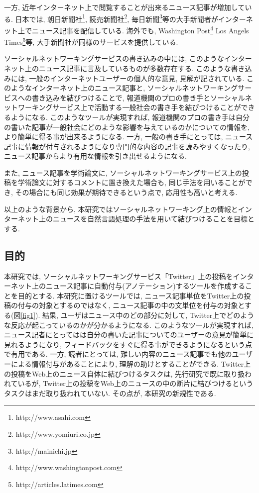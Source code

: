 \documentclass[12pt]{jarticle}
\begin{document}
一方, 近年インターネット上で閲覧することが出来るニュース記事が増加している. 日本では, 朝日新聞社\footnote{http://www.asahi.com}, 読売新聞社\footnote{http://www.yomiuri.co.jp}, 毎日新聞\footnote{http://mainichi.jp}等の大手新聞者がインターネット上でニュース記事を配信している. 海外でも, Washington Post\footnote{http://www.washingtonpost.com} Los Angels Times\footnote{http://articles.latimes.com}等, 大手新聞社が同様のサービスを提供している. 

ソーシャルネットワーキングサービスの書き込みの中には, このようなインターネット上のニュース記事に言及しているものが多数存在する. このような書き込みには, 一般のインターネットユーザーの個人的な意見, 見解が記されている. このようなインターネット上のニュース記事と, ソーシャルネットワーキングサービスへの書き込みを結びつけることで, 報道機関のプロの書き手とソーシャルネットワーキングサービス上で活動する一般社会の書き手を結びつけることができるようになる. このようなツールが実現すれば, 報道機関のプロの書き手は自分の書いた記事が一般社会にどのような影響を与えているのかについての情報を, より簡単に得る事が出来るようになる. 一方, 一般の書き手にとっては, ニュース記事に情報が付与されるようになり専門的な内容の記事を読みやすくなったり, ニュース記事からより有用な情報を引き出せるようになる. 

また, ニュース記事を学術論文に, ソーシャルネットワーキングサービス上の投稿を学術論文に対するコメントに置き換えた場合も, 同じ手法を用いることができ, その場合にも同じ効果が期待できるという点で, 応用性も高いと考える. 

以上のような背景から, 本研究ではソーシャルネットワーキング上の情報とインターネット上のニュースを自然言語処理の手法を用いて結びつけることを目標とする. 

\newpage

\subsection{目的}
本研究では, ソーシャルネットワーキングサービス「Twitter」上の投稿をインターネット上のニュース記事に自動付与(アノテーション)するツールを作成することを目的とする. 本研究に置けるツールでは, ニュース記事単位をTwitter上の投稿の付与の対象とするのではなく, ニュース記事の中の文単位を付与の対象とする(図\ref{fig1}). 結果, ユーザはニュース中のどの部分に対して, Twitter上でどのような反応が起こっているのかが分かるようになる. このようなツールが実現すれば, ニュース記者にとってはは自分の書いた記事についてのユーザーの意見が簡単に見れるようになり, フィードバックをすぐに得る事ができるようになるという点で有用である. 一方, 読者にとっては, 難しい内容のニュース記事でも他のユーザーによる情報付与があることにより, 理解の助けとすることができる. Twitter上の投稿をWeb上のニュース自体に結びつけるタスクは, 先行研究で既に取り扱われているが, Twitter上の投稿をWeb上のニュースの中の断片に結びつけるというタスクはまだ取り扱われていない. その点が, 本研究の新規性である. 
\end{document}
